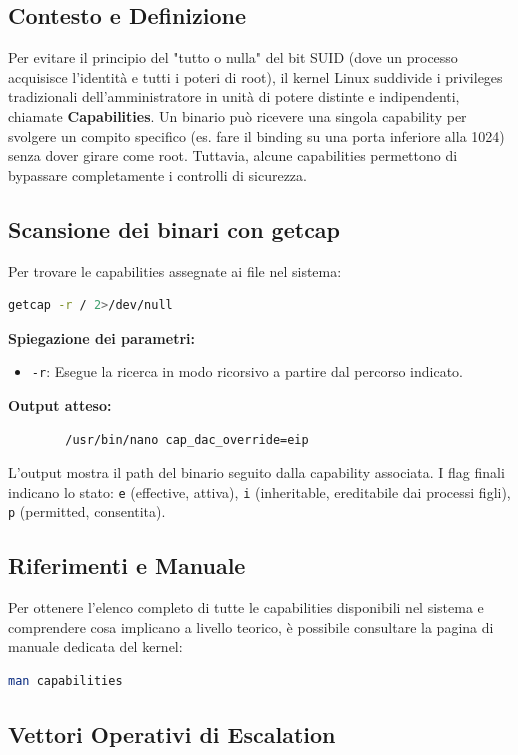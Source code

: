 \documentclass[12pt,a4paper]{report}
\begin{document}
	\subsection{Contesto e Definizione}
	Per evitare il principio del "tutto o nulla" del bit SUID (dove un processo acquisisce l'identità e tutti i poteri di root), il kernel Linux suddivide i privileges tradizionali dell'amministratore in unità di potere distinte e indipendenti, chiamate \textbf{Capabilities}. Un binario può ricevere una singola capability per svolgere un compito specifico (es. fare il binding su una porta inferiore alla 1024) senza dover girare come root. Tuttavia, alcune capabilities permettono di bypassare completamente i controlli di sicurezza.
	
	\subsection{Scansione dei binari con getcap}
	Per trovare le capabilities assegnate ai file nel sistema:
	\begin{lstlisting}[language=bash]
		getcap -r / 2>/dev/null
	\end{lstlisting}
	\textbf{Spiegazione dei parametri:}
	\begin{itemize}
		\item \texttt{-r}: Esegue la ricerca in modo ricorsivo a partire dal percorso indicato.
	\end{itemize}
	
	\textbf{Output atteso:}
	\begin{lstlisting}
		/usr/bin/nano cap_dac_override=eip
	\end{lstlisting}
	L'output mostra il path del binario seguito dalla capability associata. I flag finali indicano lo stato: \texttt{e} (effective, attiva), \texttt{i} (inheritable, ereditabile dai processi figli), \texttt{p} (permitted, consentita).
	
	\subsection{Riferimenti e Manuale}
	Per ottenere l'elenco completo di tutte le capabilities disponibili nel sistema e comprendere cosa implicano a livello teorico, è possibile consultare la pagina di manuale dedicata del kernel:
	\begin{lstlisting}[language=bash]
		man capabilities
	\end{lstlisting}
	
	\subsection{Vettori Operativi di Escalation}
	
\end{document}
